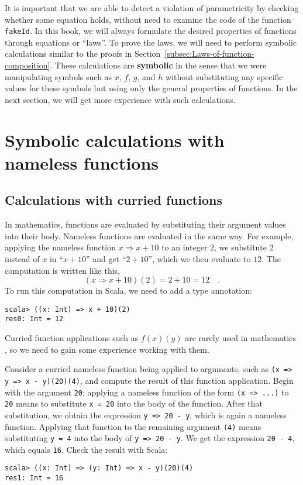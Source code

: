 It is important that we are able to detect a violation of parametricity
by checking whether some equation holds, without need to examine the
code of the function \lstinline!fakeId!. In this book, we will always
formulate the desired properties of functions through equations or
``laws''. To prove the laws, we will need to perform symbolic calculations
similar to the proofs in Section~\ref{subsec:Laws-of-function-composition}.
These calculations are \textbf{symbolic} in the sense that we were
manipulating symbols such as $x$, $f$, $g$, and $h$ without substituting
any specific values for these symbols but using only the general properties
of functions. In the next section, we will get more experience with
such calculations.

\section{Symbolic calculations with nameless functions}

\subsection{Calculations with curried functions}

In mathematics, functions are evaluated by substituting their argument
values into their body. Nameless functions are evaluated in the same
way. For example, applying the nameless function $x\Rightarrow x+10$
to an integer $2$, we substitute $2$ instead of $x$ in \textquotedblleft $x+10$\textquotedblright{}
and get \textquotedblleft $2+10$\textquotedblright , which we then
evaluate to $12$. The computation is written like this, 
\[
(x\Rightarrow x+10)(2)=2+10=12\quad.
\]
To run this computation in Scala, we need to add a type annotation:
\begin{lstlisting}
scala> ((x: Int) => x + 10)(2)
res0: Int = 12 
\end{lstlisting}

Curried function applications such as $f(x)(y)$ are rarely used in
mathematics , so we need to gain some experience working with them.

Consider a curried nameless function being applied to arguments, such
as \lstinline!(x => y => x - y)(20)(4)!, and compute the result of
this function application. Begin with the argument \lstinline!20!;
applying a nameless function of the form \lstinline!(x => ...)! to
\lstinline!20! means to substitute \lstinline!x = 20! into the body
of the function. After that substitution, we obtain the expression
\lstinline!y => 20 - y!, which is again a nameless function. Applying
that function to the remaining argument \lstinline!(4)! means substituting
\lstinline!y = 4! into the body of \lstinline!y => 20 - y!. We get
the expression \lstinline!20 - 4!, which equals \lstinline!16!.
Check the result with Scala:
\begin{lstlisting}
scala> ((x: Int) => (y: Int) => x - y)(20)(4)
res1: Int = 16
\end{lstlisting}

